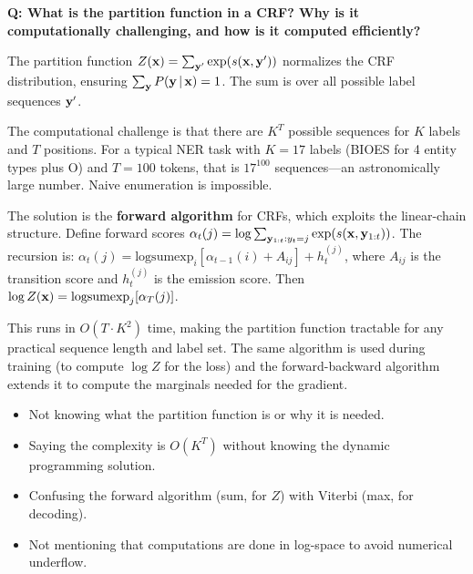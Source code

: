 \begin{interviewq}
\textbf{Q: What is the partition function in a CRF?  Why is it
computationally challenging, and how is it computed efficiently?}

 \quad {} \quad \badgefreq{\freqmed}

\stronganswer
The partition function $Z(\mathbf{x}) = \sum_{\mathbf{y}'} \exp(s(\mathbf{x}, \mathbf{y}'))$ normalizes
the CRF distribution, ensuring $\sum_{\mathbf{y}} P(\mathbf{y} \,|\, \mathbf{x}) = 1$.  The sum
is over all possible label sequences $\mathbf{y}'$.

The computational challenge is that there are $K^T$ possible sequences for $K$
labels and $T$ positions.  For a typical NER task with $K = 17$ labels (BIOES
for 4 entity types plus O) and $T = 100$ tokens, that is $17^{100}$
sequences---an astronomically large number.  Naive enumeration is impossible.

The solution is the \textbf{forward algorithm} for CRFs, which exploits the
linear-chain structure.  Define forward scores
$\alpha_t(j) = \log \sum_{\mathbf{y}_{1:t}: y_t=j} \exp(s(\mathbf{x}, \mathbf{y}_{1:t}))$.
The recursion is:
$\alpha_t(j) = \text{logsumexp}_i[\alpha_{t-1}(i) + A_{ij}] + h_t^{(j)}$,
where $A_{ij}$ is the transition score and $h_t^{(j)}$ is the emission score.
Then $\log Z(\mathbf{x}) = \text{logsumexp}_j[\alpha_T(j)]$.

This runs in $O(T \cdot K^2)$ time, making the partition function tractable
for any practical sequence length and label set.  The same algorithm is used
during training (to compute $\log Z$ for the loss) and the forward-backward
algorithm extends it to compute the marginals needed for the gradient.

\redflags
\begin{itemize}
    \item Not knowing what the partition function is or why it is needed.
    \item Saying the complexity is $O(K^T)$ without knowing the dynamic
          programming solution.
    \item Confusing the forward algorithm (sum, for $Z$) with Viterbi
          (max, for decoding).
    \item Not mentioning that computations are done in log-space to avoid
          numerical underflow.
\end{itemize}



\end{interviewq}
